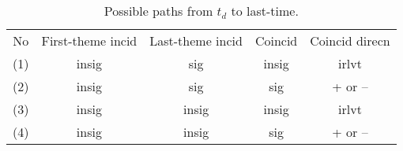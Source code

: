 \begin{table}
\caption{Possible paths from \(t_d\) to last-time.}
\label{tab:pathsforlog}
\begin{tabular}{ccccc}
No	&First-theme incid &Last-theme incid &Coincid &Coincid direcn\\
(1)	&insig	&sig	&insig	&irlvt\\
(2)	&insig	&sig	&sig	&+ or --\\
(3)	&insig	&insig	&insig	&irlvt\\
(4)	&insig	&insig	&sig	&+ or --
\end{tabular}
\end{table}
%
